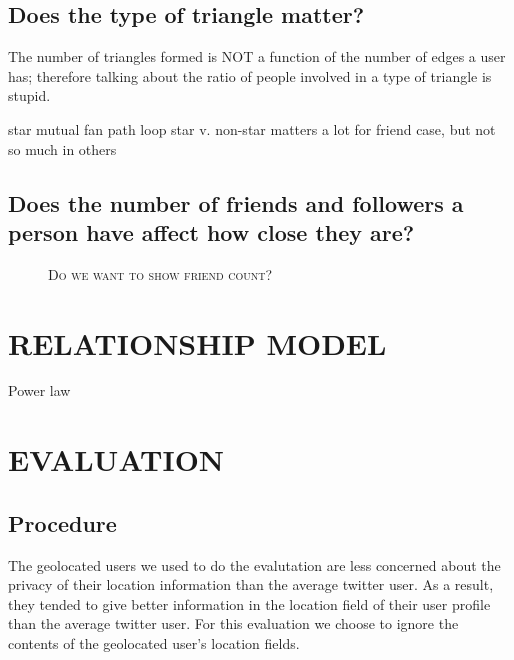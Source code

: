 \documentclass{sig-alternate}
\begin{document}
\subsection{Does the type of triangle matter?}
\begin{figure*}
\centering
{}
\caption{
}
\label{fig:TriadTypes}
\end{figure*}


The number of triangles formed is NOT a function of the number of edges a user has; therefore talking about the ratio of people involved in a type of triangle is stupid.

star
mutual fan
path
loop 
star v. non-star matters a lot for friend case, but not so much in others



\subsection{Does the number of friends and followers a person have affect how close they are?}

\begin{figure*}
\centering
{}
\caption{
\textsc{Do we want to show friend count?}
}
\label{fig:LocalAll}
\end{figure*}


\section{RELATIONSHIP MODEL}
\label{sec:model}

Power law
\begin{figure}
\centering
{}
\caption{}
\label{fig:EdgeTypesMdist}
\end{figure}



\section{EVALUATION}
\subsection{Procedure}
The geolocated users we used to do the evalutation are less concerned about the
privacy of their location information than the average twitter user.
As a result, they tended to give better information in the location field of
their user profile than the average twitter user.
For this evaluation we choose to ignore the contents of the geolocated user's
location fields.
\end{document}
